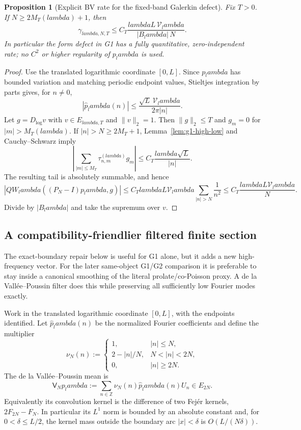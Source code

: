 \documentclass[11pt]{article}
\def\lambda{lambda}%
\newtheorem{proposition}[theorem]{Proposition}
\theoremstyle{remark}
\begin{document}
\begin{proposition}[Explicit BV rate for the fixed-band Galerkin defect]\label{prop:g1-bv-rate}
Fix $T>0$.  If $N\ge2M_T(\lambda)+1$, then
\begin{equation}\label{eq:g1-gamma-rate}
 \boxed{
 \gamma_{\lambda,N,T}
 \le C_T\frac{\lambda L\,\mathcal V_\lambda}
 {|B_\lambda|\,N}.}
\end{equation}
In particular the form defect in G1 has a fully quantitative,
zero-independent rate; no $C^2$ or higher regularity of $p_\lambda$ is used.
\end{proposition}
\begin{proof}
Use the translated logarithmic coordinate $[0,L]$.  Since $p_\lambda$ has
bounded variation and matching periodic endpoint values, Stieltjes integration
by parts gives, for $n\ne0$,
\[
 |\widehat p_\lambda(n)|
 \le\frac{\sqrt L\,\mathcal V_\lambda}{2\pi|n|}.
\]
Let $g=D_{\log}v$ with $v\in E_{\lambda,T}$ and $\|v\|_2=1$.  Then
$\|g\|_2\le T$ and $g_m=0$ for $|m|>M_T(\lambda)$.  If $|n|>N\ge2M_T+1$,
Lemma~\ref{lem:g1-high-low} and Cauchy--Schwarz imply
\[
 \left|\sum_{|m|\le M_T}\tau^{(\lambda)}_{n,m}g_m\right|
 \le C_T\frac{\lambda\sqrt L}{|n|}.
\]
The resulting tail is absolutely summable, and hence
\[
 |QW_\lambda((P_N-I)p_\lambda,g)|
 \le C_T\lambda L\mathcal V_\lambda
       \sum_{|n|>N}\frac1{n^2}
 \le C_T\frac{\lambda L\mathcal V_\lambda}{N}.
\]
Divide by $|B_\lambda|$ and take the supremum over $v$.
\end{proof}

\subsection{A compatibility-friendlier filtered finite section}
The exact-boundary repair below is useful for G1 alone, but it adds a new
high-frequency vector.  For the later same-object G1/G2 comparison it is
preferable to stay inside a canonical smoothing of the literal
prolate/co-Poisson proxy.  A de la Vall\'ee--Poussin filter does this while
preserving all sufficiently low Fourier modes exactly.

Work in the translated logarithmic coordinate $[0,L]$, with the endpoints
identified.  Let $\widehat p_\lambda(n)$ be the normalized Fourier
coefficients and define the multiplier
\begin{equation}\label{eq:g1-vp-multiplier}
 \nu_N(n):=
 \begin{cases}
  1,& |n|\le N,\\
  2-|n|/N,&N<|n|<2N,\\
  0,&|n|\ge2N.
 \end{cases}
\end{equation}
The de la Vall\'ee--Poussin mean is
\begin{equation}\label{eq:g1-vp-mean}
 \mathsf V_Np_\lambda
 :=\sum_{n\in\mathbb Z}\nu_N(n)\widehat p_\lambda(n)U_n\in E_{2N}.
\end{equation}
Equivalently its convolution kernel is the difference of two Fej\'er kernels,
$2F_{2N}-F_N$.  In particular its $L^1$ norm is bounded by an absolute
constant and, for $0<\delta\le L/2$, the kernel mass outside the boundary arc
$|x|<\delta$ is $O(L/(N\delta))$.
\end{document}
